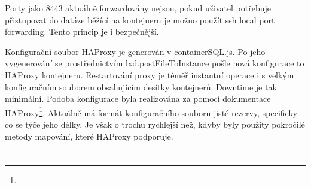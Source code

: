 \documentclass[a4paper,oneside,12pt]{report}
\let\openright=\clearpage
\begin{document}
Porty jako 8443 aktuálně forwardovány nejsou, pokud uživatel potřebuje přistupovat do datáze běžící na kontejneru je možno použít ssh local port forwarding.
Tento princip je i bezpečnější.

Konfigurační soubor HAProxy je generován v containerSQL.js.
Po jeho vygenerování se prostřednictvím lxd.postFileToInstance pošle nová konfigurace to HAProxy kontejneru.
Restartování proxy je téměř instantní operace i s velkým konfiguračním souborem obsahujícím desítky kontejnerů.
Downtime je tak minimální.
Podoba konfigurace byla realizována za pomocí dokumentace HAProxy\footnote{}.
Aktuálně má formát konfiguračního souboru jisté rezervy, specificky co se týče jeho délky.
Je však o trochu rychlejší než, kdyby byly použity pokročilé metody mapování, které HAProxy podporuje.



\chapter*{}
\setcounter{page}{6}




\listoffigures
\openright
\end{document}
